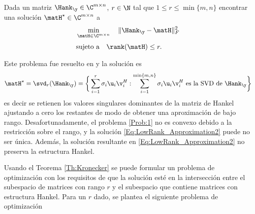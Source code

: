 
	\begin{Prob}\label{Prob:1}
		Dada un matriz $\Hank_{\y}\in\C^{m\times n}$, $r\in\N$ tal que $1\le r\le \min\{m,n\}$ encontrar una solución $\matH^\star\in\C^{m\times n}$ a 
		\begin{equation}
			\begin{aligned} 
				& \min_{\matH\in\C^{m\times n}} \quad \|\Hank_{\y}-\matH\|_F^2\\[0.3em]
				& \text{sujeto a} \quad \rank(\matH) \le r.
			\end{aligned}
			\label{Eq:LowRank_Approximation1}
		\end{equation}
	\end{Prob}
	Este problema fue resuelto en \cite{Eckart1936} y la solución es 
	\begin{equation}
		\matH^\star = \svd_r(\Hank_{\y}) =\bigg\{ \sum_{i=1}^r\sigma_i\u_i\v_i^H : \sum_{i=1}^{\min\{m,n\}}\sigma_i\u_i\v_i^H  \text{ es la SVD de } \Hank_{\y}\bigg\}
		\label{Eq:LowRank_Approximation2}
	\end{equation}
	es decir se retienen los valores singulares dominantes de la matriz de Hankel ajustando a cero los restantes de modo de obtener una aproximación de bajo rango. Desafortunadamente, el problema \eqref{Prob:1} no es convexo debido a la restricción sobre el rango, y la solución \eqref{Eq:LowRank_Approximation2} puede no ser única. Además, la solución resultante en \eqref{Eq:LowRank_Approximation2} no preserva la estructura Hankel.  

	Usando el Teorema \ref{Th:Kronecker} se puede formular un problema de optimización con los requisitos de que la solución esté en la intersección entre el subespacio de matrices con rango $r$ y el subespacio que contiene matrices con estructura Hankel. Para un $r$ dado, se plantea el siguiente problema de optimización

